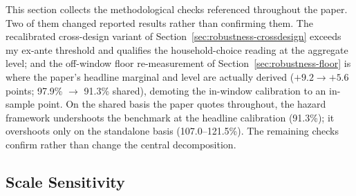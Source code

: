 \documentclass[12pt]{article}
\begin{document}
This section collects the methodological checks referenced throughout the paper. Two of them changed reported results rather than confirming them. The recalibrated cross-design variant of Section~\ref{sec:robustness-crossdesign} exceeds my ex-ante threshold and qualifies the household-choice reading at the aggregate level; and the off-window floor re-measurement of Section~\ref{sec:robustness-floor} is where the paper's headline marginal and level are actually derived ($+9.2 \to +5.6$ points; 97.9\% $\to$ 91.3\% shared), demoting the in-window calibration to an in-sample point. On the shared basis the paper quotes throughout, the hazard framework undershoots the benchmark at the headline calibration (91.3\%); it overshoots only on the standalone basis (107.0--121.5\%). The remaining checks confirm rather than change the central decomposition.

\subsection{Scale Sensitivity}\label{sec:robustness-scale}
\end{document}
